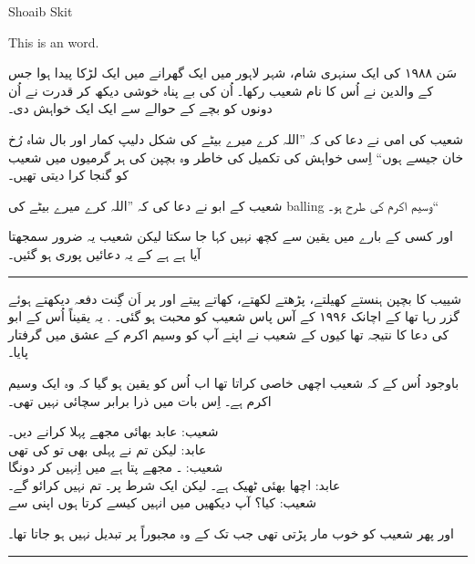 \documentclass{article}
\begin{document}
\begin{center} \LARGE
	Shoaib Skit
\end{center}

This is an  word.

\startUrdu

سَن ۱۹۸۸ کی ایک سنہری شام، شہر لاہور میں ایک گھرانے میں ایک لڑکا پیدا ہوا جس کے والدین نے اُس کا نام شعیب رکھا۔ اُن کی بے پناہ خوشی دیکھ کر قدرت نے اُن دونوں کو بچے کے حوالے سے ایک ایک خواہش دی۔ 

شعیب کی امی نے دعا کی کہ ''اللہ کرے میرے بیٹے کی شکل دلیپ کمار اور بال شاہ رُخ خان جیسے ہوں`` اِسی خواہش کی تکمیل کی خاطر وہ بچپن کی ہر گرمیوں میں شعیب کو گنجا کرا دیتی تھیں۔ \textit{}

شعیب کے ابو نے دعا کی کہ ''اللہ کرے میرے بیٹے کی balling وسیم اکرم کی طرح ہو۔``

اور کسی کے بارے میں یقین سے کچھ نہیں کہا جا سکتا لیکن شعیب یہ ضرور سمجھتا آیا ہے ہے کے یہ دعائیں پوری ہو گئیں۔

\rule{\textwidth}{1pt}

شییب کا بچپن ہنستے کھیلتے، پڑھتے لکھتے،  کھاتے پیتے اور  پر اَن گِنت دفعہ  دیکھتے ہوئے گزر رہا تھا کے اچانک ۱۹۹۶ کے آس پاس شعیب کو محبت ہو گئی۔ . یہ یقیناً اُس کے ابو کی دعا کا نتیجہ تھا کیوں کے شعیب نے اپنے آپ کو وسیم اکرم کے عشق میں گرفتار پایا۔

باوجود اُس کے کہ شعیب اچھی خاصی  کراتا تھا اب اُس کو یقین ہو گیا کہ وہ ایک  وسیم اکرم ہے۔ اِس بات میں ذرا برابر سچائی نہیں تھی۔


شعیب:  عابد بھائی مجھے پہلا  کرانے دیں۔\\
عابد: لیکن تم نے پہلی  بھی تو کی تھی\\
شعیب: ۔ مجھے پتا ہے میں اِنہیں  کر دونگا\\
عابد: اچھا بھئی ٹھیک ہے۔ لیکن ایک شرط پر۔ تم  نہیں کرائو گے۔\\
شعیب: کیا؟ آپ دیکھیں میں انہیں کیسے  کرتا ہوں اپنی  سے

اور پھر شعیب کو خوب مار پڑتی تھی جب تک کے وہ مجبوراً  پر تبدیل نہیں ہو جاتا تھا۔

\rule{\textwidth}{1pt}
\end{document}
